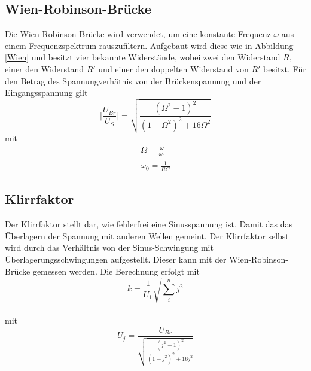     \subsection{Wien-Robinson-Brücke}
    Die Wien-Robinson-Brücke wird verwendet, um eine konstante Frequenz $\omega$ aus einem Frequenzspektrum rauszufiltern.
    Aufgebaut wird diese wie in Abbildung \ref{Wien} und besitzt vier bekannte Widerstände, wobei zwei den Widerstand $R$, einer den Widerstand $R'$ und einer den doppelten Widerstand von $R'$ besitzt.
    Für den Betrag des Spannungverhätnis von der Brückenspannung und der Eingangsspannung gilt 
    \begin{equation}
       \biggl|\frac{U_{Br}}{U_S}\biggr|=\sqrt{\frac{(\Omega^2-1)^2}{(1-\Omega^2)^2+16\Omega^2}}
    \end{equation}
    mit 
    \begin{gather}
        \Omega=\frac{\omega}{\omega_0}\\
        \omega_0=\frac{1}{RC}
    \end{gather}

    \subsection{Klirrfaktor}
    Der Klirrfaktor stellt dar, wie fehlerfrei eine Sinusspannung ist. 
    Damit das das Überlagern der Spannung mit anderen Wellen gemeint.
    Der Klirrfaktor selbst wird durch das Verhältnis von der Sinus-Schwingung mit Überlagerungsschwingungen aufgestellt.
    Dieser kann mit der Wien-Robinson-Brücke gemessen werden.       
    Die Berechnung erfolgt mit 
    \begin{equation}
        k=\frac{1}{U_1}\sqrt{\sum_{i}^{n}{j^2}}
    \end{equation}\\
    mit
    \begin{equation}
        U_j=\frac{U_{Br}}{\sqrt{\frac{(j^2-1)^2}{(1-j^2)^2+16j^2}}} 
    \end{equation}

